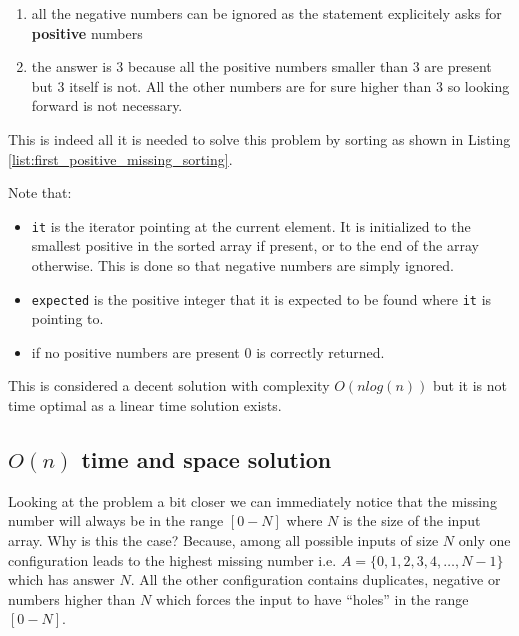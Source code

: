 \begin{enumerate}
	\item all the negative numbers can be ignored as the statement explicitely asks for \textbf{positive} numbers
	\item the answer is $3$ because all the positive numbers smaller than $3$ are present but $3$ itself is not. All the other numbers are for sure higher than $3$ so looking forward is not necessary.
\end{enumerate}

This is indeed all it is needed to solve this problem by sorting as shown in Listing \ref{list:first_positive_missing_sorting}.



Note that:
\begin{itemize}
	\item[] \texttt{it} is the iterator pointing at the current element. It is initialized to the smallest positive in the sorted array if present, or to the end of the array otherwise. This is done so that negative numbers are simply ignored.
	\item[] \texttt{expected} is the positive integer that it is expected to be found where \texttt{it} is pointing to.
	\item[] if no positive numbers are present $0$ is correctly returned.
\end{itemize}

This is considered a decent solution with complexity $O(nlog(n))$ but it is not time optimal as a linear time solution exists. 

\subsection{$O(n)$ time and space solution}
\label{first_positive_missing:sec:linear_space}

Looking at the problem a bit closer we can immediately notice that the missing number will always be in the range $[0-N]$ where $N$ is the size of the input array. Why is this the case? Because, among all possible inputs of size $N$ only one configuration leads to the highest missing number i.e. $A = \{0,1,2,3,4, \ldots ,N-1\}$ which has answer $N$. All the other configuration contains duplicates, negative or numbers higher than $N$ which forces the input to have ``holes'' in the range $[0-N]$. 

